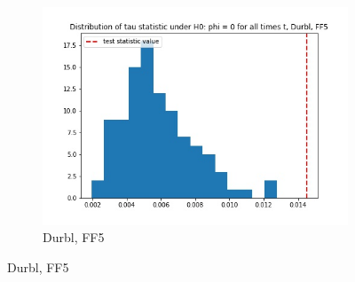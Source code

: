 \documentclass{article}
\begin{document}
\begin{figure}
\begin{subfigure}[b]{0.3\textwidth}
    \includegraphics[width=\textwidth]{Durbl/tau_hist_02_FF5.jpg}
    \caption{Durbl, FF5}
    \label{fig:2}
  \end{subfigure}
  \end{figure}
  
\end{document}
